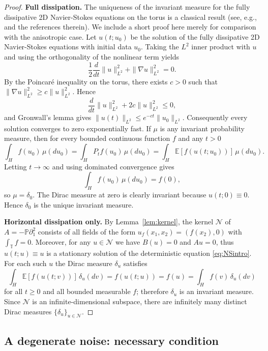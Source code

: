 \documentclass[11pt,a4paper,reqno]{amsart}
\theoremstyle{definition}
\begin{document}
\begin{proof}
  \textbf{Full dissipation.}  The uniqueness of the invariant measure for the
  fully dissipative 2D Navier-Stokes equations on the torus is a classical
  result (see, e.g., \cite{DPZ,LR} and the references therein). We include a
  short proof here merely for comparison with the anisotropic case. Let \(u(t;u_{0})\) be the solution of
  the fully dissipative 2D Navier-Stokes equations with initial data \(u_{0}\).  Taking the \(L^{2}\) inner
  product with \(u\) and using the orthogonality of the nonlinear term yields
  \[
    \frac12\frac{d}{dt}\|u\|_{L^{2}}^{2} + \|\nabla u\|_{L^{2}}^{2}=0 .
  \]
  By the Poincar\'e inequality on the torus,
  there exists \(c>0\) such that \(\|\nabla u\|_{L^{2}}^{2}\ge c\|u\|_{L^{2}}^{2}\).
  Hence
  \[
    \frac{d}{dt}\|u\|_{L^{2}}^{2} + 2c\|u\|_{L^{2}}^{2}\le 0,
  \]
  and Gronwall's lemma gives \(\|u(t)\|_{L^{2}}\le e^{-ct}\|u_{0}\|_{L^{2}}\).
  Consequently every solution converges to zero exponentially fast.
  If \(\mu\) is any invariant probability measure, then for every bounded
  continuous function \(f\) and any \(t>0\)
  \[
    \int_{H} f(u_{0})\,\mu(du_{0})
    = \int_{H} P_{t}f(u_{0})\,\mu(du_{0})
    = \int_{H} \mathbb{E}[f(u(t;u_{0}))]\,\mu(du_{0}) .
  \]
  Letting \(t\to\infty\) and using dominated convergence gives
  \[
    \int_{H} f(u_{0})\,\mu(du_{0}) = f(0),
  \]
  so \(\mu=\delta_{0}\).  The Dirac measure at zero is clearly invariant
  because \(u(t;0)\equiv0\).  Hence \(\delta_{0}\) is the unique invariant
  measure.

  \textbf{Horizontal dissipation only.}  By Lemma~\ref{lem:kernel}, the kernel
  \(\mathcal{N}\) of \(A=-\mathbb{P}\partial_{1}^{2}\) consists of all fields of
  the form \(u_{f}(x_{1},x_{2})=(f(x_{2}),0)\) with \(\int_{\mathbb{T}}f=0\).
  Moreover, for any \(u\in\mathcal{N}\) we have \(B(u)=0\) and \(Au=0\), thus
  \(u(t;u)\equiv u\) is a stationary solution of the deterministic equation
  \eqref{eq:NSintro}.  For each such \(u\) the Dirac measure \(\delta_{u}\) satisfies
  \[
    \int_{H} \mathbb{E}[f(u(t;v))]\,\delta_{u}(dv)
    = f(u(t;u)) = f(u) = \int_{H} f(v)\,\delta_{u}(dv)
  \]
  for all \(t\ge0\) and all bounded measurable \(f\); therefore \(\delta_{u}\)
  is an invariant measure.  Since \(\mathcal{N}\) is an infinite-dimensional
  subspace, there are infinitely many distinct Dirac measures
  \(\{\delta_{u}\}_{u\in\mathcal{N}}\).
\end{proof}

\subsection{A degenerate noise: necessary condition}
\label{sec:degenerate}
\end{document}
